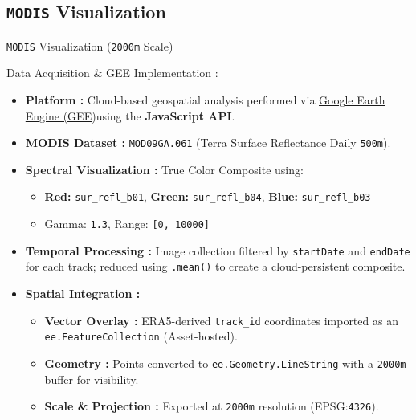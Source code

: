 \documentclass[8pt, aspectratio=169]{beamer}
\begin{document}
\subsection{\texttt{MODIS} Visualization}
\begin{frame}{\texttt{MODIS} Visualization (\texttt{2000m} Scale)}
    \begin{center}
        \footnotesize
        \begin{block}{Data Acquisition \& GEE Implementation :}
            \begin{itemize}
                \item \textbf{Platform :} Cloud-based geospatial analysis performed via \href{https://earthengine.google.com/}{Google Earth Engine (GEE)}\footnotemark[6] using the \textbf{JavaScript API}.
                \item \textbf{MODIS Dataset :} \texttt{MOD09GA.061} (Terra Surface Reflectance Daily \texttt{500m}).
                \item \textbf{Spectral Visualization :} True Color Composite using:
                \begin{itemize}
                    \footnotesize
                    \item \textbf{Red:} \texttt{sur\_refl\_b01}, \textbf{Green:} \texttt{sur\_refl\_b04}, \textbf{Blue:} \texttt{sur\_refl\_b03}
                    \item Gamma: \texttt{1.3}, Range: \texttt{[0, 10000]}
                \end{itemize}
                \item \textbf{Temporal Processing :} Image collection filtered by \texttt{startDate} and \texttt{endDate} for each track; reduced using \texttt{.mean()} to create a cloud-persistent composite.
                \item \textbf{Spatial Integration :} 
                \begin{itemize}
                    \footnotesize
                    \item \textbf{Vector Overlay :} ERA5-derived \texttt{track\_id} coordinates imported as an \texttt{ee.FeatureCollection} (Asset-hosted)\footnotemark[7].
                    \item \textbf{Geometry :} Points converted to \texttt{ee.Geometry.LineString} with a \texttt{2000m} buffer for visibility.
                    \item \textbf{Scale \& Projection :} Exported at \texttt{2000m} resolution (EPSG:\texttt{4326}).
                \end{itemize}
            \end{itemize}
        \end{block}


\end{center}
\end{frame}
\end{document}

